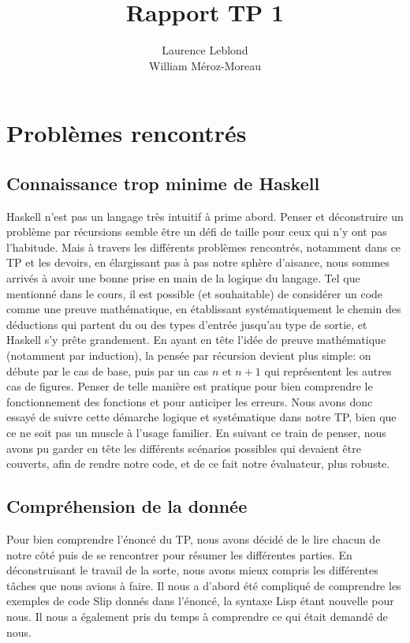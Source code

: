 \documentclass{article}
\title{Rapport TP 1}
\author{Laurence Leblond \\ William Méroz-Moreau}
\begin{document}
	\maketitle

	\section{Problèmes rencontrés}

	\subsection{Connaissance trop minime de Haskell}

	Haskell n'est pas un langage très intuitif à prime abord. Penser et déconstruire
	un problème par récursions semble être un défi de taille pour ceux qui n'y ont
	pas l'habitude. Mais à travers les différents problèmes rencontrés, notamment dans
	ce TP et les devoirs, en élargissant pas à pas notre sphère d'aisance, nous sommes
	arrivés à avoir une bonne prise en main de la logique du langage. Tel que
	mentionné dans le cours, il est possible (et souhaitable) de considérer un code
	comme une preuve mathématique, en établissant systématiquement le chemin des
	déductions qui partent du ou des types d'entrée jusqu'au type de sortie, et Haskell
	s'y prête grandement. En ayant en tête l'idée de preuve mathématique (notamment
	par induction), la pensée par récursion devient plus simple: on débute par le
	cas de base, puis par un cas $n$ et $n+1$ qui représentent les autres cas de figures.
	Penser de telle manière est pratique pour bien comprendre le fonctionnement
	des fonctions et pour anticiper les erreurs. Nous avons donc essayé de suivre cette
	démarche logique et systématique dans notre TP, bien que ce ne soit pas un
	muscle à l'usage familier. En suivant ce train de penser, nous avons pu garder
	en tête les différents scénarios possibles qui devaient être couverts, afin de rendre
	notre code, et de ce fait notre évaluateur, plus robuste.

	\subsection{Compréhension de la donnée}

	Pour bien comprendre l'énoncé du TP, nous avons décidé de le lire chacun de notre
	côté puis de se rencontrer pour résumer les différentes parties. En
	déconstruisant le travail de la sorte, nous avons mieux compris les différentes
	tâches que nous avions à faire. Il nous a d'abord été compliqué de comprendre
	les exemples de code Slip donnés dans l'énoncé, la syntaxe Lisp étant nouvelle
	pour nous. Il nous a également pris du temps à comprendre ce qui était demandé
	de nous.
\end{document}
